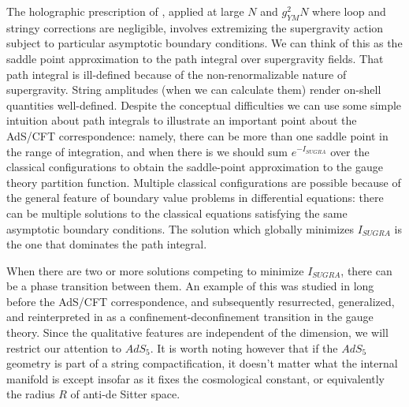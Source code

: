 The holographic prescription of \cite{Gubser:1998bc,Witten:1998qj}, applied at
large $N$ and $g_{YM}^2 N$
where loop and stringy corrections are negligible, involves extremizing
the supergravity action subject to particular
asymptotic boundary conditions.  We
can think of this as the saddle point approximation to the path
integral over supergravity fields.  That path integral is ill-defined
because of the non-renormalizable nature of supergravity.  String
amplitudes (when we can calculate them) render on-shell quantities
well-defined.  Despite the conceptual difficulties we can use some
simple intuition about path integrals to illustrate an important point
about the AdS/CFT correspondence: namely, there can be more than one
saddle point in the range of integration, and when there is we should
sum $e^{-I_{SUGRA}}$ over the classical configurations to obtain the
saddle-point approximation to the gauge theory partition function.
Multiple classical configurations are possible because of the general
feature of boundary value problems in differential equations: there
can be multiple solutions to the classical equations satisfying the
same asymptotic boundary conditions.  The solution which globally
minimizes $I_{SUGRA}$ is the one that dominates the path integral.

When there are two or more solutions competing to minimize
$I_{SUGRA}$, there can be a phase transition between them.  An example
of this was studied in \cite{Hawking:1983dh} long before the AdS/CFT
correspondence, and subsequently resurrected, generalized, and
reinterpreted in \cite{Witten:1998qj,Witten:1998zw} as a
confinement-deconfinement transition in the gauge theory.  Since the
qualitative features are independent of the dimension, we will restrict
our attention to $AdS_5$.  It is worth noting however that if the
$AdS_5$ geometry is part of a string compactification, it doesn't
matter what the internal manifold is except insofar as it fixes the
cosmological constant, or equivalently the radius $R$ of anti-de
Sitter space.


